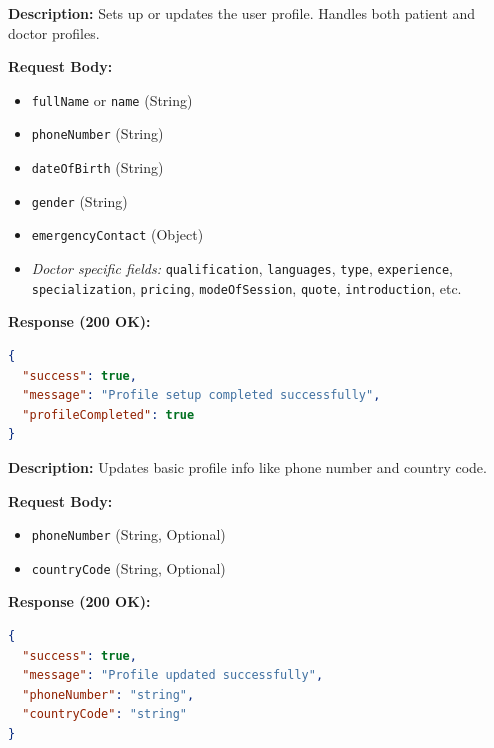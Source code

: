 \documentclass{article}
\begin{document}
\begin{tcolorbox}[title=\textcolor{accent}{POST} /api/profile/setup]
\textbf{Description:} Sets up or updates the user profile. Handles both patient and doctor profiles.

\vspace{0.5em}
\textbf{Request Body:}
\begin{itemize}
    \item \texttt{fullName} or \texttt{name} (String)
    \item \texttt{phoneNumber} (String)
    \item \texttt{dateOfBirth} (String)
    \item \texttt{gender} (String)
    \item \texttt{emergencyContact} (Object)
    \item \textit{Doctor specific fields:} \texttt{qualification}, \texttt{languages}, \texttt{type}, \texttt{experience}, \texttt{specialization}, \texttt{pricing}, \texttt{modeOfSession}, \texttt{quote}, \texttt{introduction}, etc.
\end{itemize}

\vspace{0.5em}
\textbf{Response (200 OK):}
\begin{lstlisting}[language=json]
{
  "success": true,
  "message": "Profile setup completed successfully",
  "profileCompleted": true
}
\end{lstlisting}
\end{tcolorbox}

\begin{tcolorbox}[title=\textcolor{accent}{PUT} /api/profile]
\textbf{Description:} Updates basic profile info like phone number and country code.

\vspace{0.5em}
\textbf{Request Body:}
\begin{itemize}
    \item \texttt{phoneNumber} (String, Optional)
    \item \texttt{countryCode} (String, Optional)
\end{itemize}

\vspace{0.5em}
\textbf{Response (200 OK):}
\begin{lstlisting}[language=json]
{
  "success": true,
  "message": "Profile updated successfully",
  "phoneNumber": "string",
  "countryCode": "string"
}
\end{lstlisting}
\end{tcolorbox}
\end{document}
